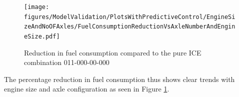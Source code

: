 \documentclass[ExampleMasters.tex]{subfiles}
\begin{document}
\begin{figure}[h!]
\centering
\texttt{[image: figures/ModelValidation/PlotsWithPredictiveControl/EngineSizeAndNoOFAxles/FuelConsumptionReductionVsAxleNumberAndEngineSize.pdf]}
\caption{Reduction in fuel consumption compared to the pure ICE combination 011-000-00-000}
\label{fuelReductionAxleEnginePredictiveSoC}
\end{figure}

The percentage reduction in fuel consumption thus shows clear trends with engine size and axle configuration as seen in Figure \ref{fuelReductionAxleEnginePredictiveSoC}. 
\end{document}
